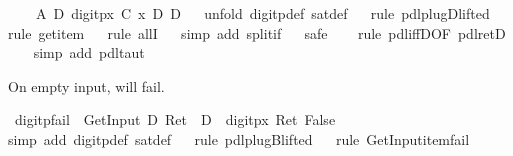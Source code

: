 \begin{isabellebody}
\ \ {\isacharparenleft}\ {\isachardoublequote}{\isasymturnstile}\ {\isacharquery}A\ {\isasymlongrightarrow}\isactrlsub D\ {\isasymlangle}digitp{\isasymrangle}{\isacharparenleft}{\isasymlambda}x{\isachardot}\ {\isacharquery}C\ x\ {\isasymand}\isactrlsub D\ {\isacharquery}D{\isacharparenright}{\isachardoublequote}{\isacharparenright}\isanewline
\ \ \isamarkupfalse%
unfold\ digitp{\isacharunderscore}def\ sat{\isacharunderscore}def{\isacharparenright}\isanewline
\ \ \isamarkupfalse%
rule\ pdl{\isacharunderscore}plugD{\isacharunderscore}lifted{}{\isacharparenright}\isanewline
\ \ \isamarkupfalse%
rule\ get{\isacharunderscore}item{\isacharparenright}\isanewline
\ \ \isamarkupfalse%
rule\ allI{\isacharparenright}\isanewline
\ \ \isamarkupfalse%
simp\ add{\isacharcolon}\ split{\isacharunderscore}if{\isacharparenright}\isanewline
\ \ \isamarkupfalse%
safe{\isacharparenright}\ \isanewline
\ \ \isamarkupfalse%
rule\ pdl{\isacharunderscore}iffD{}{\isacharbrackleft}OF\ pdl{\isacharunderscore}retD{\isacharbrackright}{\isacharparenright}\isanewline
\ \ \isamarkupfalse%
\ {\isacharparenleft}simp\ add{\isacharcolon}\ pdl{\isacharunderscore}taut{\isacharparenright}\ %
\isamarkupfalse%
%
\begin{isamarkuptext}%
On empty input,  will fail.%
\end{isamarkuptext}%
\isamarkuptrue%
\ digitp{\isacharunderscore}fail{\isacharcolon}\ {\isachardoublequote}{\isasymturnstile}\ GetInput\ {\isacharequal}\isactrlsub D\ Ret\ {\isacharbrackleft}{\isacharbrackright}\ {\isasymlongrightarrow}\isactrlsub D\ {\isacharbrackleft}{\isacharhash}\ digitp{\isacharbrackright}{\isacharparenleft}{\isasymlambda}x{\isachardot}\ Ret\ False{\isacharparenright}{\isachardoublequote}\isanewline
\ \ \isamarkupfalse%
simp\ add{\isacharcolon}\ digitp{\isacharunderscore}def\ sat{\isacharunderscore}def{\isacharparenright}\isanewline
\ \ \isamarkupfalse%
rule\ pdl{\isacharunderscore}plugB{\isacharunderscore}lifted{}{\isacharparenright}\isanewline
\ \ \isamarkupfalse%
rule\ GetInput{\isacharunderscore}item{\isacharunderscore}fail{\isacharparenright}\isanewline

\end{isabellebody}
